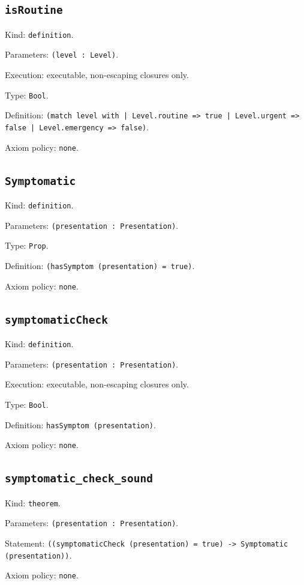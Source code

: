 \documentclass[11pt]{article}
\begin{document}
\subsection*{\texttt{isRoutine}}
\noindent Kind: \texttt{definition}.\par
\noindent Parameters: \texttt{(level : Level)}.\par
\noindent Execution: executable, non-escaping closures only.\par
\noindent Type: \texttt{Bool}.\par
\noindent Definition: \texttt{(match level with | Level.routine => true | Level.urgent => false | Level.emergency => false)}.\par
\noindent Axiom policy: \texttt{none}.\par
\subsection*{\texttt{Symptomatic}}
\noindent Kind: \texttt{definition}.\par
\noindent Parameters: \texttt{(presentation : Presentation)}.\par
\noindent Type: \texttt{Prop}.\par
\noindent Definition: \texttt{(hasSymptom (presentation) = true)}.\par
\noindent Axiom policy: \texttt{none}.\par
\subsection*{\texttt{symptomaticCheck}}
\noindent Kind: \texttt{definition}.\par
\noindent Parameters: \texttt{(presentation : Presentation)}.\par
\noindent Execution: executable, non-escaping closures only.\par
\noindent Type: \texttt{Bool}.\par
\noindent Definition: \texttt{hasSymptom (presentation)}.\par
\noindent Axiom policy: \texttt{none}.\par
\subsection*{\texttt{symptomatic\_check\_sound}}
\noindent Kind: \texttt{theorem}.\par
\noindent Parameters: \texttt{(presentation : Presentation)}.\par
\noindent Statement: \texttt{((symptomaticCheck (presentation) = true) -> Symptomatic (presentation))}.\par
\noindent Axiom policy: \texttt{none}.\par
\end{document}

